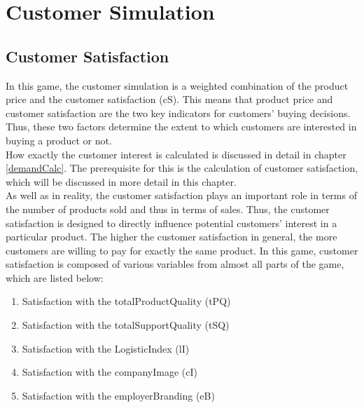 \section{Customer Simulation}
\label{sec:customsim}
\subsection{Customer Satisfaction}
In this game, the customer simulation is a weighted combination of the product price and the customer satisfaction (\gls{cS}).
This means that product price and customer satisfaction are the two key indicators for customers' buying decisions. Thus, these two factors determine the extent to which customers are interested in buying a product or not.\\
How exactly the customer interest is calculated is discussed in detail in chapter \ref{demandCalc}. The prerequisite for this is the calculation of customer satisfaction, which will be discussed in more detail in this chapter.\\
As well as in reality, the customer satisfaction plays an important role in terms of the number of products sold and thus in terms of sales. \cite{deptolla_effects_2004}
Thus, the customer satisfaction is designed to directly influence potential customers' interest in a particular product. The higher the customer satisfaction in general, the more customers are willing to pay for exactly the same product. 
In this game, customer satisfaction is composed of various variables from almost all parts of the game, which are listed below:
\begin{enumerate}
      \item Satisfaction with the totalProductQuality (tPQ)
      \item Satisfaction with the totalSupportQuality (tSQ)
      \item Satisfaction with the LogisticIndex (lI)
      \item Satisfaction with the companyImage (cI)
      \item Satisfaction with the employerBranding (eB)
\end{enumerate}


